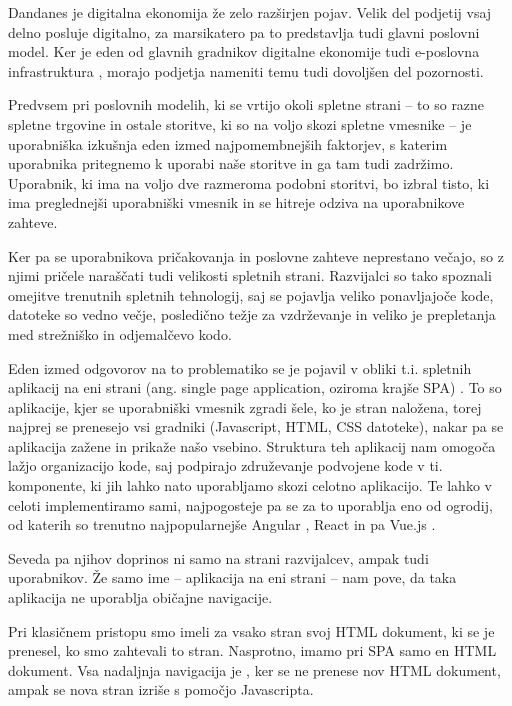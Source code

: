 \documentclass[a4paper, 12pt]{book}
\begin{document}
Dandanes je digitalna ekonomija že zelo razširjen pojav. Velik del podjetij vsaj delno posluje digitalno, za marsikatero pa to predstavlja tudi glavni poslovni model. Ker je eden od glavnih gradnikov digitalne ekonomije tudi e-poslovna infrastruktura \cite{digital_econ}, morajo podjetja nameniti temu tudi dovoljšen del pozornosti.

Predvsem pri poslovnih modelih, ki se vrtijo okoli spletne strani – to so razne spletne trgovine in ostale storitve, ki so na voljo skozi spletne vmesnike – je uporabniška izkušnja eden izmed najpomembnejših faktorjev, s katerim uporabnika pritegnemo k uporabi naše storitve in ga tam tudi zadržimo. Uporabnik, ki ima na voljo dve razmeroma podobni storitvi, bo izbral  tisto, ki ima preglednejši uporabniški vmesnik in se hitreje odziva na uporabnikove zahteve. 

Ker pa se uporabnikova pričakovanja in poslovne zahteve neprestano večajo, so z njimi pričele naraščati tudi velikosti spletnih strani. Razvijalci so tako spoznali omejitve trenutnih spletnih tehnologij, saj se pojavlja veliko ponavljajoče kode, datoteke so vedno večje, posledično težje za vzdrževanje in veliko je prepletanja med strežniško in odjemalčevo kodo.

Eden izmed odgovorov na to problematiko se je pojavil v obliki t.i. spletnih aplikacij na eni strani (ang. single page application, oziroma krajše SPA) \cite{spa_blakit} \cite{spa_vs_multi} \cite{spa_presentation}. To so aplikacije, kjer se uporabniški vmesnik zgradi šele, ko je stran naložena, torej najprej se prenesejo vsi gradniki (Javascript, HTML, CSS datoteke), nakar pa se aplikacija zažene in prikaže našo vsebino. Struktura teh aplikacij nam omogoča lažjo organizacijo kode, saj podpirajo združevanje podvojene kode v ti. komponente, ki jih lahko nato uporabljamo skozi celotno aplikacijo. Te lahko v celoti implementiramo sami, najpogosteje pa se za to uporablja eno od ogrodij, od katerih so trenutno najpopularnejše Angular \cite{angular_website}, React \cite{react_website} in pa Vue.js \cite{vue_website}.

Seveda pa njihov doprinos ni samo na strani razvijalcev, ampak tudi uporabnikov. Že samo ime -- aplikacija na eni strani -- nam pove, da taka aplikacija ne uporablja običajne navigacije.

Pri klasičnem pristopu smo imeli za vsako stran svoj HTML dokument, ki se je prenesel, ko smo zahtevali to stran. Nasprotno, imamo pri SPA samo en HTML dokument. Vsa nadaljnja navigacija je , ker se ne prenese nov HTML dokument, ampak se nova stran izriše s pomočjo Javascripta.
\end{document}
